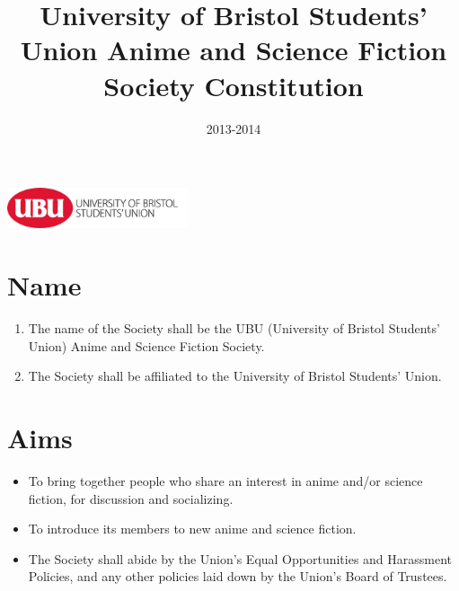 \documentclass[a4paper,10pt]{article}
\title{University of Bristol Students' Union Anime and Science Fiction Society Constitution}
\author{}
\date{2013-2014}
\begin{document}
\begin{titlepage}
 


\clearpage\maketitle
\thispagestyle{empty}
\vfill
\includegraphics[height=1.2cm,keepaspectratio=true]{./images/ubu-logo.png}

\end{titlepage}

\section{Name}
\begin{enumerate}
  \item The name of the Society shall be the UBU (University of Bristol Students' Union) Anime and Science Fiction Society.
  \item The Society shall be affiliated to the University of Bristol Students' Union.
\end{enumerate}

\section{Aims}
\begin{itemize}
  \item To bring together people who share an interest in anime and/or science fiction, for discussion and socializing.
  \item To introduce its members to new anime and science fiction.
  \item The Society shall abide by the Union's Equal Opportunities and Harassment Policies, and any other policies laid down by the Union's Board of Trustees.
\end{itemize}
\end{document}
